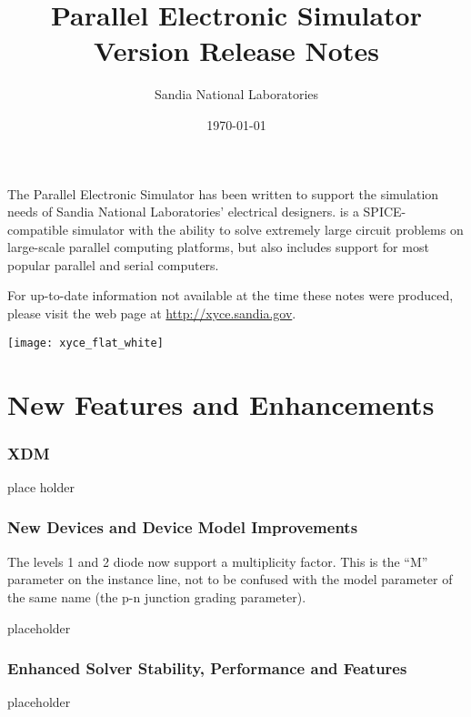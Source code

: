 \documentclass[letterpaper]{scrartcl}
\title{\XyceTitle{} Parallel Electronic Simulator\\
Version \XyceVersionVar{} Release Notes}
\author{ Sandia National Laboratories}
\date{\today}
\begin{document}
\maketitle

The \XyceTM{} Parallel Electronic Simulator has been written to support the
simulation needs of Sandia National Laboratories' electrical designers.
\XyceTM{} is a SPICE-compatible simulator with the ability to solve extremely
large circuit problems on large-scale parallel computing platforms, but also
includes support for most popular parallel and serial computers.

For up-to-date information not available at the time these notes were produced,
please visit the \XyceTM{} web page at
{\color{XyceDeepRed}\url{http://xyce.sandia.gov}}.

\tableofcontents
\vspace*{\fill}
\parbox{\textwidth}
{
  \hfill
  \texttt{[image: xyce\_flat\_white]}
}


\newpage
\section{New Features and Enhancements}

\subsubsection*{XDM}
\begin{XyceItemize}
  \item place holder
\end{XyceItemize}

\subsubsection*{New Devices and Device Model Improvements}
\begin{XyceItemize}
  \item The levels 1 and 2 diode now support a multiplicity factor.  This is the ``M'' parameter on the instance line, not to be confused with the model parameter of the same name (the p-n junction grading parameter).
  \item placeholder
\end{XyceItemize}

\subsubsection*{Enhanced Solver Stability, Performance and Features}
\begin{XyceItemize}
  \item placeholder
\end{XyceItemize}
\end{document}
